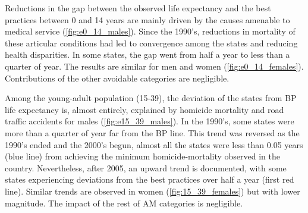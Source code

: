 \documentclass{article}
\begin{document}
Reductions in the gap between the observed life expectancy and the best practices between 0 and 14 years are mainly driven by the causes amenable to medical service (\ref{fig:e0_14_males}). Since the 1990's, reductions in mortality of these articular conditions had led to convergence among the states and reducing health disparities. In some states, the gap went from half a year to less than a quarter of year. The results are similar for men and women (\ref{fig:e0_14_females}). Contributions of the other avoidable categories are negligible. 

Among the young-adult population (15-39), the deviation of the states from BP life expectancy is, almost entirely, explained by homicide mortality and road traffic accidents for males (\ref{fig:e15_39_males}). In the 1990's, some states were more than a quarter of year far from the BP line. This trend was reversed as the 1990's ended and the 2000's begun, almost all the states were less than 0.05 years (blue line) from achieving the minimum homicide-mortality observed in the country. Nevertheless, after 2005, an upward trend is documented, with some states experiencing deviations from the best practices over half a year (first red line). Similar trends are observed in women (\ref{fig:15_39_females}) but with lower magnitude. The impact of the rest of AM categories is negligible. 
\end{document}
